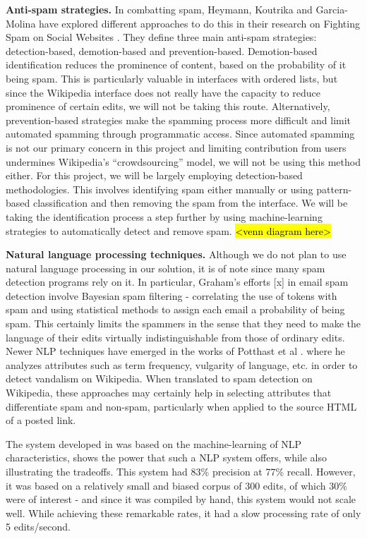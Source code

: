 \documentclass[letterpaper]{sig-alternate}
\begin{document}
\textbf{Anti-spam strategies.} In combatting spam, Heymann, Koutrika and Garcia-Molina have explored different approaches to do this in their research on Fighting Spam on Social Websites \cite{eigen}. They define three main anti-spam strategies: detection-based, demotion-based and prevention-based.  Demotion-based identification reduces the prominence of content, based on the probability of it being spam. This is particularly valuable in interfaces with ordered lists, but since the Wikipedia interface does not really have the capacity to reduce prominence of certain edits, we will not be taking this route. Alternatively, prevention-based strategies make the spamming process more difficult and limit automated spamming through programmatic access. Since automated spamming is not our primary concern in this project and limiting contribution from users undermines Wikipedia's ``crowdsourcing'' model, we will not be using this method either. For this project, we will be largely employing detection-based methodologies. This involves identifying spam either manually or using pattern-based classification and then removing the spam from the interface. We will be taking the identification process a step further by using machine-learning strategies to automatically detect and remove spam. \hl{<venn diagram here>}

\textbf{Natural language processing techniques.} Although we do not plan to use natural language processing in our solution, it is of note since many spam detection programs rely on it. In particular, Graham's efforts [x] in email spam detection involve Bayesian spam filtering - correlating the use of tokens with spam and using statistical methods to assign each email a probability of being spam. This certainly limits the spammers in the sense that they need to make the language of their edits virtually indistinguishable from those of ordinary edits. Newer NLP techniques have emerged in the works of Potthast et al \cite{potthast_auto_vandal}. where he analyzes attributes such as term frequency, vulgarity of language, etc. in order to detect vandalism on Wikipedia. When translated to spam detection on Wikipedia, these approaches may certainly help in selecting attributes that differentiate spam and non-spam, particularly when applied to the source HTML of a posted link.

The system developed in \cite{potthast_auto_vandal} was based on the machine-learning of NLP characteristics, shows the power that such a NLP system offers, while also illustrating the tradeoffs. This system had 83\% precision at 77\% recall. However, it was based on a relatively small and biased corpus of 300 edits, of which 30\% were of interest - and since it was compiled by hand, this system would not scale well. While achieving these remarkable rates, it had a slow processing rate of only 5 edits/second.
\end{document}
